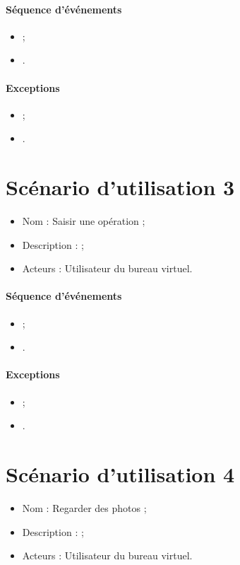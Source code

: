 \paragraph{Séquence d'événements}
\begin{itemize}
	\item ;
	\item .
\end{itemize}

\paragraph{Exceptions}
\begin{itemize}
	\item ;
	\item .
\end{itemize}


\section{Scénario d'utilisation 3}
\begin{itemize}
	\item Nom : Saisir une opération ;
	\item Description :  ;
	\item Acteurs : Utilisateur du bureau virtuel.
\end{itemize}

\paragraph{Séquence d'événements}
\begin{itemize}
	\item ;
	\item .
\end{itemize}

\paragraph{Exceptions}
\begin{itemize}
	\item ;
	\item .
\end{itemize}


\section{Scénario d'utilisation 4}
\begin{itemize}
	\item Nom : Regarder des photos ;
	\item Description :  ;
	\item Acteurs : Utilisateur du bureau virtuel.
\end{itemize}

